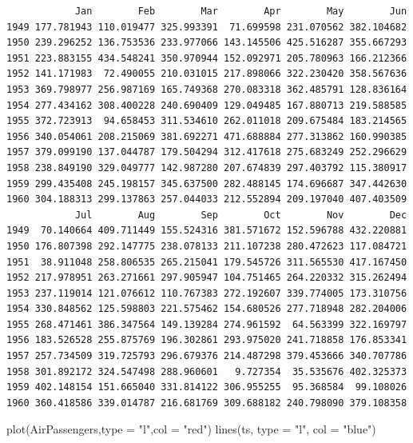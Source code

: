 \documentclass[
  letterpaper,
  DIV=11,
  numbers=noendperiod]{scrreprt}
\newenvironment{Shaded}{\begin{snugshade}}{\end{snugshade}}
\newcommand{\AttributeTok}[1]{\textcolor[rgb]{0.40,0.45,0.13}{#1}}
\newcommand{\FunctionTok}[1]{\textcolor[rgb]{0.28,0.35,0.67}{#1}}
\newcommand{\NormalTok}[1]{\textcolor[rgb]{0.00,0.23,0.31}{#1}}
\newcommand{\StringTok}[1]{\textcolor[rgb]{0.13,0.47,0.30}{#1}}
\begin{document}
\begin{verbatim}
            Jan        Feb        Mar        Apr        May        Jun
1949 177.781943 110.019477 325.993391  71.699598 231.070562 382.104682
1950 239.296252 136.753536 233.977066 143.145506 425.516287 355.667293
1951 223.883155 434.548241 350.970944 152.092971 205.780963 166.212366
1952 141.171983  72.490055 210.031015 217.898066 322.230420 358.567636
1953 369.798977 256.987169 165.749368 270.083318 362.485791 128.836164
1954 277.434162 308.400228 240.690409 129.049485 167.880713 219.588585
1955 372.723913  94.658453 311.534610 262.011018 209.675484 183.214565
1956 340.054061 208.215069 381.692271 471.688884 277.313862 160.990385
1957 379.099190 137.044787 179.504294 312.417618 275.683249 252.296629
1958 238.849190 329.049777 142.987280 207.674839 297.403792 115.380917
1959 299.435408 245.198157 345.637500 282.488145 174.696687 347.442630
1960 304.188313 299.137863 257.044033 212.552894 209.197040 407.403509
            Jul        Aug        Sep        Oct        Nov        Dec
1949  70.140664 409.711449 155.524316 381.571672 152.596788 432.220881
1950 176.807398 292.147775 238.078133 211.107238 280.472623 117.084721
1951  38.911048 258.806535 265.215041 179.545726 311.565530 417.167450
1952 217.978951 263.271661 297.905947 104.751465 264.220332 315.262494
1953 237.119014 121.076612 110.767383 272.192607 339.774005 173.310756
1954 330.848562 125.598803 221.575462 154.680526 277.718948 282.204006
1955 268.471461 386.347564 149.139284 274.961592  64.563399 322.169797
1956 183.526528 255.875769 196.302861 293.975020 241.718858 176.853341
1957 257.734509 319.725793 296.679376 214.487298 379.453666 340.707786
1958 301.892172 324.547498 288.960601   9.727354  35.535676 402.325373
1959 402.148154 151.665040 331.814122 306.955255  95.368584  99.108026
1960 360.418586 339.014787 216.681769 309.688182 240.798090 379.108358
\end{verbatim}

\begin{Shaded}
\begin{Highlighting}[]
\FunctionTok{plot}\NormalTok{(AirPassengers,}\AttributeTok{type =} \StringTok{"l"}\NormalTok{,}\AttributeTok{col =} \StringTok{"red"}\NormalTok{)}
\FunctionTok{lines}\NormalTok{(ts, }\AttributeTok{type =} \StringTok{"l"}\NormalTok{, }\AttributeTok{col =} \StringTok{"blue"}\NormalTok{)}
\end{Highlighting}
\end{Shaded}
\end{document}
